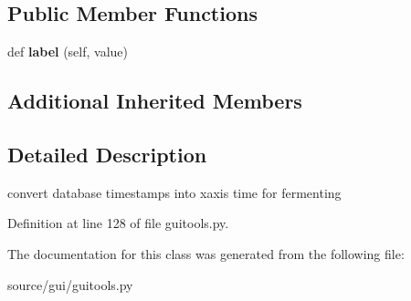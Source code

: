 \subsection*{Public Member Functions}
\begin{DoxyCompactItemize}
\item 
\mbox{\label{classguitools_1_1_ferment_time_scale_draw_a14d581a9c0b5c4d696ce90eba0a68834}} 
def {\bfseries label} (self, value)
\end{DoxyCompactItemize}
\subsection*{Additional Inherited Members}


\subsection{Detailed Description}
convert database timestamps into xaxis time for fermenting 

Definition at line 128 of file guitools.\+py.



The documentation for this class was generated from the following file\+:\begin{DoxyCompactItemize}
\item 
source/gui/guitools.\+py\end{DoxyCompactItemize}
